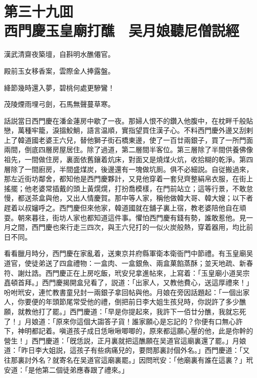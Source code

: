 
\chapter*{第三十九囬　\\西門慶玉皇廟打醮　吴月娘聽尼僧説經}


\begin{myquote}
漢武清齋夜築壇，自斟明水醮僊官。

殿前玉女移香案，雲際金人捧露盤。

絳節幾時還入夢，碧桃何處更驂鸞！

茂陵煙雨埋弓劍，石馬無聲蔓草寒。
\end{myquote}

話説當日西門慶在潘金蓮房中歇了一夜。那婦人恨不的鑽入他腹中，在枕畔千般貼戀，萬種牢籠，淚搵鮫鮹，語言温順，實指望買住漢子心。不料西門慶外邊又刮剌上了韓道國老婆王六兒，替他獅子街石橋東邊，使了一百廿兩銀子，買了一所門面兩間，倒底四層房屋居住。除了過道，第二層間半客位。第三層除了半間供養佛像祖先，一間做住房，裏面依舊鑲着炕床，對面又是燒煤火炕，收拾糊的乾淨。第四層除了一間廚房，半間盛煤炭，後邊還有一塊做坑厠。俱不必細説。自従搬過來，那左近街坊鄰舍，都知他是西門慶夥計，又見他穿着一套兒齊整絹帛衣服，在街上搖擺；他老婆常插戴的頭上黃熀熀，打扮喬模樣，在門前站立；這等行景，不敢怠慢，都送茶盒與他，又出人情慶賀。那中等人家，稱他做韓大哥、韓大嫂；以下者趕着以叔嬸呼之。西門慶但來他家，韓道國就在舖子裏上宿，教老婆陪他自在頑耍。朝來暮往，街坊人家也都知道這件事。懼怕西門慶有錢有勢，誰敢惹他。見一月之間，西門慶也來行走三四次，與王六兒打的一似火炭般熱，穿着器用，均比前日不同。

看看臘月時分，西門慶在家亂着，送東京并府縣軍衛本衛衙門中節禮。有玉皇廟吴道官，使徒弟送了四盒禮物：一盒肉、一盒銀魚、兩盒菓餡蒸酥；並天地疏、新春符、謝灶誥。西門慶正在上房吃飯，玳安兒拿進帖來，上寫着：「玉皇廟小道吴宗嚞頓首拜。」西門慶揭開盒兒看了，説道：「出家人，又教他費心，送這厚禮來！」吩咐玳安，連忙教書童兒封一兩銀子拿回帖與他。月娘在旁因話題起：「一個出家人，你要便的年頭節尾常受他的禮，倒把前日李大姐生孩兒時，你説許了多少醮願，就教他打了罷。」西門慶道：「早是你提起來，我許下一佰廿分醮，我就忘死了！」月娘道：「原來你這個大謅答子貨！誰家願心是忘記的？你便有口無心許下，神明都記着。嗔道孩子成日恁啾啾唧唧的，原來都這願心壓的他，此是你幹的營生！」西門慶道：「旣恁説，正月裏就把這醮願在吴道官這廟裏還了罷。」月娘道：「昨日李大姐説，這孩子有些病痛兒的，要問那裏討個外名。」西門慶道：「又往那裏討外名？就寄名在吴道官這廟裏罷。」因問玳安：「他廟裏有誰在這裏？」玳安道：「是他第二個徒弟應春跟了禮來。」

